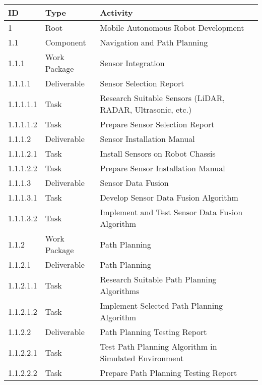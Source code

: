 \documentclass[10pt]{projectdoc}
\begin{document}
\begin{table}[H]
    \centering
    \begin{tabular}{|l|l|l|}
    \hline
    \textbf{\textbf{ID}} & \textbf{Type} & \textbf{Activity}                                          \\ \hline
    1                    & Root          & Mobile Autonomous Robot Development                        \\ \hline
    1.1                  & Component     & Navigation and Path Planning                               \\ \hline
    1.1.1                & Work Package  & Sensor Integration                                         \\ \hline
    1.1.1.1              & Deliverable   & Sensor Selection Report                                    \\ \hline
    1.1.1.1.1            & Task          & Research Suitable Sensors (LiDAR, RADAR, Ultrasonic, etc.) \\ \hline
    1.1.1.1.2            & Task          & Prepare Sensor Selection Report                            \\ \hline
    1.1.1.2              & Deliverable   & Sensor Installation Manual                                 \\ \hline
    1.1.1.2.1            & Task          & Install Sensors on Robot Chassis                           \\ \hline
    1.1.1.2.2            & Task          & Prepare Sensor Installation Manual                         \\ \hline
    1.1.1.3              & Deliverable   & Sensor Data Fusion                                         \\ \hline
    1.1.1.3.1            & Task          & Develop Sensor Data Fusion Algorithm                       \\ \hline
    1.1.1.3.2            & Task          & Implement and Test Sensor Data Fusion Algorithm            \\ \hline
    1.1.2                & Work Package  & Path Planning                                              \\ \hline
    1.1.2.1              & Deliverable   & Path Planning                                              \\ \hline
    1.1.2.1.1            & Task          & Research Suitable Path Planning Algorithms                 \\ \hline
    1.1.2.1.2            & Task          & Implement Selected Path Planning Algorithm                 \\ \hline
    1.1.2.2              & Deliverable   & Path Planning Testing Report                               \\ \hline
    1.1.2.2.1            & Task          & Test Path Planning Algorithm in Simulated Environment      \\ \hline
    1.1.2.2.2            & Task          & Prepare Path Planning Testing Report                       \\ \hline
    \end{tabular}%
    \end{table}
\end{document}
